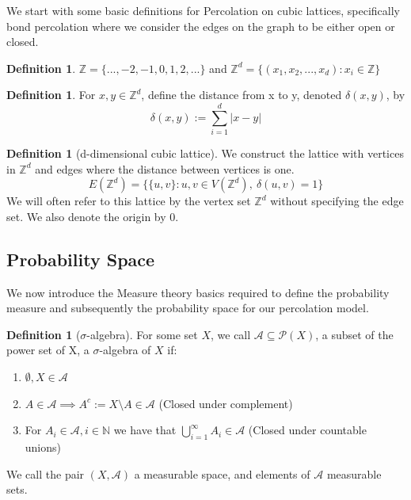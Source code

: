 \documentclass[a4paper,11pt]{article}
\theoremstyle{definition}
\newtheorem{definition}[theorem]{Definition}
\newcommand{\ints}{\mathbb{Z}}
\begin{document}
We start with some basic definitions for Percolation on cubic lattices, specifically bond percolation where we consider the edges on the graph to be either open or closed. 

\begin{definition}\label{ints} 
	$\mathbb{Z} = \{...,-2,-1,0,1,2,...\}$ and $\mathbb{Z}^d = \{(x_1,x_2,...,x_d) : x_i \in \mathbb{Z} \}$
\end{definition}

\begin{definition}\label{dist}
	For $x,y\in \mathbb{Z}^d$, define the distance from x to y, denoted $\delta(x,y)$, by
	$$\delta(x,y) := \sum_{i=1}^{d}|x-y|$$
\end{definition}\label{lattice} 

\begin{definition}[d-dimensional cubic lattice]{
	We construct the lattice with vertices in $\ints^d$ and edges where the distance between vertices is one.
	$$E(\ints^d) = \{\{u,v\}:u,v \in V(\ints^d),\: \delta(u,v) = 1\}$$
	We will often refer to this lattice by the vertex set $\ints^d$ without specifying the edge set.
	We also denote the origin by 0.
}
\end{definition}


\subsection{Probability Space}

We now introduce the Measure theory basics required to define the probability measure and subsequently the probability space for our percolation model.

\begin{definition}[$\sigma$-algebra]
	For some set $X$, we call $\mathcal{A} \subseteq \mathcal{P}(X)$, a subset of the power set of X, a  $\sigma$-algebra of $X$ if:
	\begin{enumerate}
		\item $\emptyset,X \in \mathcal{A}$
		\item $A \in \mathcal{A} \implies A^c := X \setminus A \in \mathcal{A}$ (Closed under complement)
		\item For $A_i \in \mathcal{A}, i \in \mathbb{N}$ we have that $\bigcup^\infty_{i=1} A_i \in \mathcal{A}$ (Closed under countable unions)
	\end{enumerate}
	We call the pair $(X,\mathcal{A})$ a measurable space, and elements of $\mathcal{A}$ measurable sets.
\end{definition}
\end{document}
